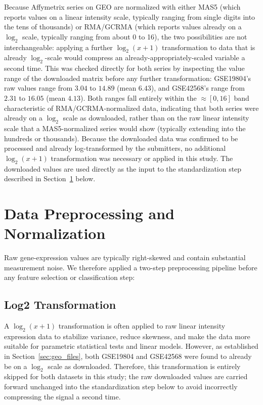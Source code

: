 Because Affymetrix series on GEO are normalized with either MAS5 (which reports values on a linear intensity scale, typically ranging from single digits into the tens of thousands) or RMA/GCRMA (which reports values already on a $\log_2$ scale, typically ranging from about 0 to 16), the two possibilities are not interchangeable: applying a further $\log_2(x+1)$ transformation to data that is already $\log_2$-scale would compress an already-appropriately-scaled variable a second time. This was checked directly for both series by inspecting the value range of the downloaded matrix before any further transformation: GSE19804's raw values range from $3.04$ to $14.89$ (mean $6.43$), and GSE42568's range from $2.31$ to $16.05$ (mean $4.13$). Both ranges fall entirely within the $\approx[0,16]$ band characteristic of RMA/GCRMA-normalized data, indicating that both series were already on a $\log_2$ scale as downloaded, rather than on the raw linear intensity scale that a MAS5-normalized series would show (typically extending into the hundreds or thousands). Because the downloaded data was confirmed to be processed and already log-transformed by the submitters, no additional $\log_2(x+1)$ transformation was necessary or applied in this study. The downloaded values are used directly as the input to the standardization step described in Section~\ref{sec:preprocessing} below.

\section{Data Preprocessing and Normalization}
\label{sec:preprocessing}

Raw gene-expression values are typically right-skewed and contain substantial measurement noise. We therefore applied a two-step preprocessing pipeline before any feature selection or classification step:

\subsection{Log2 Transformation}

A $\log_2(x+1)$ transformation is often applied to raw linear intensity expression data to stabilize variance, reduce skewness, and make the data more suitable for parametric statistical tests and linear models. However, as established in Section~\ref{sec:geo_files}, both GSE19804 and GSE42568 were found to already be on a $\log_2$ scale as downloaded. Therefore, this transformation is entirely skipped for both datasets in this study; the raw downloaded values are carried forward unchanged into the standardization step below to avoid incorrectly compressing the signal a second time.

